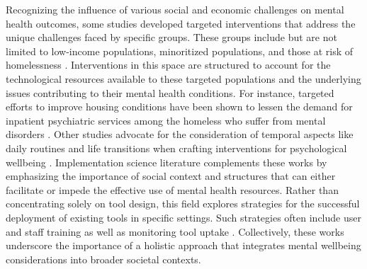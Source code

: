Recognizing the influence of various social and economic challenges on mental health outcomes, some studies developed targeted interventions that address the unique challenges faced by specific groups. These groups include but are not limited to low-income populations, minoritized populations, and those at risk of homelessness \cite{aubry2016multiple, kerman2018effects, leung2015household, murnane2018personal, sallis2015ecological, li2010stage, schueller2019use}. Interventions in this space are structured to account for the technological resources available to these targeted populations and the underlying issues contributing to their mental health conditions. 
For instance, targeted efforts to improve housing conditions have been shown to lessen the demand for inpatient psychiatric services among the homeless who suffer from mental disorders \cite{kerman2018effects}. %
Other studies advocate for the consideration of temporal aspects like daily routines and life transitions when crafting interventions for psychological wellbeing \cite{doherty2010fieldwork, murnane2018personal, reddy2006temporality}. Implementation science literature \cite{graham2020implementation, urquhart2020defining, powell2015refined} complements these works by emphasizing the importance of social context and structures that can either facilitate or impede the effective use of mental health resources. Rather than concentrating solely on tool design, this field explores strategies for the successful deployment of existing tools in specific settings. Such strategies often include user and staff training as well as monitoring tool uptake \cite{powell2015refined, powell2012compilation}. Collectively, these works underscore the importance of a holistic approach that integrates mental wellbeing considerations into broader societal contexts. 





